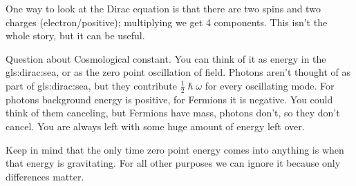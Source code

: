 \documentclass[]{article}
\begin{document}
One way to look at the Dirac equation is that there are two spins and two charges (electron/positive); multiplying we get 4 components. This isn't the whole story, but it can be useful.

Question about Cosmological constant. You can think of it as energy in the \gls{gls:dirac:sea}, or as the zero point oscillation of field. Photons aren't thought of as part of \gls{gls:dirac:sea}, but they contribute $\frac{1}{2}\hslash\omega$ for every oscillating mode. For photons background energy is positive, for Fermions it is negative. You could think of them canceling, but Fermions have mass, photons don't, so they don't cancel. You are always left with some huge amount of energy left over. 

Keep in mind that the only time zero point energy comes into anything is when that energy is gravitating. For all other purposes we can ignore it because only differences matter.

\printglossaries


\raggedright

\end{document}
